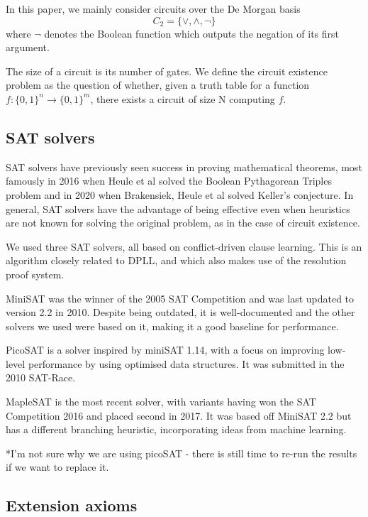\documentclass{article}
\begin{document}
In this paper, we mainly consider circuits over the De Morgan basis \[C_2 = \{\lor, \land, \neg\}\] where \(\neg\) denotes the Boolean function which outputs the negation of its first argument.

The size of a circuit is its number of gates. We define the circuit existence problem as the question of whether, given a truth table for a function \(f: \{0,1\}^n \to \{0,1\}^m\), there exists a circuit of size N computing \(f\).

\subsection{SAT solvers}

SAT solvers have previously seen success in proving mathematical theorems, most famously in 2016 when Heule et al solved the Boolean Pythagorean Triples problem\cite{heule} and in 2020 when Brakensiek, Heule et al solved Keller's conjecture\cite{heule2}. In general, SAT solvers have the advantage of being effective even when heuristics are not known for solving the original problem, as in the case of circuit existence.

We used three SAT solvers, all based on conflict-driven clause learning. This is an algorithm closely related to DPLL, and which also makes use of the resolution proof system.\cite{cdcl}\cite{krajicek}

MiniSAT\cite{minisat} was the winner of the 2005 SAT Competition and was last updated to version 2.2 in 2010\cite{minisat2010}. Despite being outdated, it is well-documented and the other solvers we used were based on it, making it a good baseline for performance.

PicoSAT is a solver inspired by miniSAT 1.14, with a focus on improving low-level performance by using optimised data structures\cite{picosat}. It was submitted in the 2010 SAT-Race.

MapleSAT is the most recent solver, with variants having won the SAT Competition 2016 and placed second in 2017. It was based off MiniSAT 2.2 but has a different branching heuristic, incorporating ideas from machine learning\cite{maplesat}.

*I'm not sure why we are using picoSAT - there is still time to re-run the results if we want to replace it.

\subsection{Extension axioms}
\end{document}
